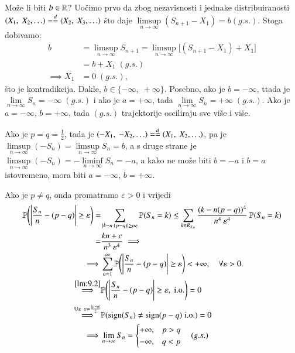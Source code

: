 \begin{pr}
    Mo\v ze li biti $b \in \mathbb{R}$?
    Uo\v cimo prvo da zbog nezavisnosti i jednake distribuiranosti $(X_1, \; X_2, \ldots) = \overset{d}{=} (X_2, \; X_3, \ldots)$ \v sto daje $\limsup\limits_{n \to \infty} (S_{n + 1} - X_1) = b (g.s.)$.
    Stoga dobivamo:
    \begin{equation*}
        \begin{aligned}
            b &= \limsup\limits_{n \to \infty} S_{n + 1} = \limsup\limits_{n \to \infty} \big[ (S_{n + 1} - X_1) + X_1 \big]\\
            &= b + X_1 \; (g.s.)\\
            \implies X_1 &= 0 \; (g.s.),
        \end{aligned}
    \end{equation*}
    \v sto je kontradikcija.
    Dakle, $b \in \{-\infty, \; +\infty\}$.
    Posebno, ako je $b = -\infty$, ttada je $\lim\limits_{n  \to \infty} S_n = -\infty \; (g.s.)$ i ako je $a = + \infty$, tada $\lim\limits_{n \to \infty} S_n = +\infty \; (g.s.)$.
    Ako je $a = -\infty$, $b = +\infty$, tada $(g.s.)$ trajektorije osciliraju sve vi\v se i vi\v se.

    Ako je $p = q = \frac{1}{2}$, tada je $(-X_1, \; -X_2, \ldots) = \overset{d}{=} (X_1, \; X_2, \ldots)$, pa je $\limsup\limits_{n \to \infty} (-S_n) = \limsup\limits_{n \to \infty} S_n = b$, a s druge strane je $\limsup\limits_{n \to \infty} (-S_n) = - \liminf\limits_{n \to \infty} S_n = -a$, a kako ne mo\v ze biti $b = -a$ i $b = a$ istovremeno, mora biti $a = -\infty$, $b = +\infty$.

    Ako je $p \neq q$, onda promatramo $\varepsilon > 0$ i vrijedi
    \begin{equation*}
        \begin{aligned}
            \mathbb{P} \Bigg( \Bigg|\frac{S_n}{n} - (p - q) \Bigg| \geq \varepsilon \Bigg) =& \sum\limits_{|k - n \: (p-q)| \geq n \varepsilon}^{} \mathbb{P}({S_n = k}) \leq \sum\limits_{k \in R_{S_n}}^{} \frac{(k - n(p-q))^4}{n^4 \: \varepsilon^4} \: \mathbb{P}({S_n = k})\\
            =& \frac{k n + c}{n^3 \: \varepsilon^4} \implies\\
            \implies & \sum\limits_{n = 1}^{\infty} \mathbb{P} \Bigg( \Bigg| \frac{S_n}{n} - (p - q) \Bigg| \geq \varepsilon \Bigg) < + \infty, \quad \forall \varepsilon > 0.\\
            \overset{\ref{lm:9.2}}{\implies} & \mathbb{P} \Bigg( \Bigg| \frac{S_n}{n} - (p - q) \Bigg| \geq \varepsilon, \; \mathrm{i.o.} \Bigg) = 0\\
            \overset{\textnormal{Uz }\; \varepsilon = \frac{|p - q|}{2}}{\implies} & \mathbb{P}({\operatorname{sign} (S_n) \neq \operatorname{sign} (p - q) \; \mathrm{i.o.}}) = 0\\
            \implies & \lim\limits_{n \to \infty} S_n
            =
            \begin{cases}
                + \infty, &p > q\\
                - \infty, &q < p
            \end{cases}
            \quad (g.s.)
        \end{aligned}
    \end{equation*}
\end{pr}

